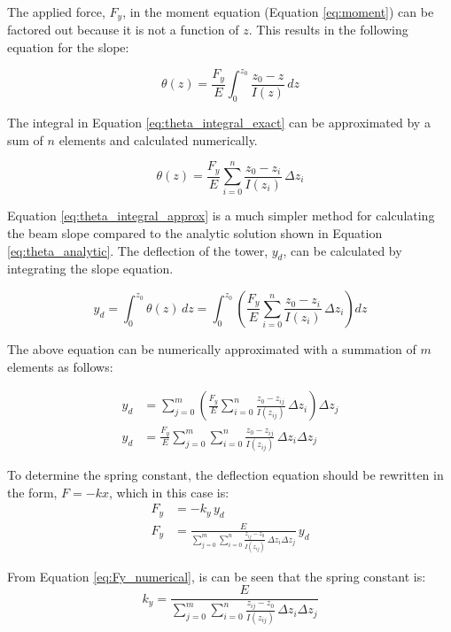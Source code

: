 The applied force, $F_y$, in the moment equation (Equation \ref{eq:moment}) can be factored out because it is not a function of $z$.  This results in the following equation for the slope:

\begin{equation} \label{eq:theta_integral_exact}
	\theta(z) = \frac{F_y}{E} \int_0^{z_0}{\frac{z_0-z}{I(z)}\,dz}
\end{equation}

The integral in Equation \ref{eq:theta_integral_exact} can be approximated by a sum of $n$ elements and calculated numerically.

\begin{equation} \label{eq:theta_integral_approx}
	\theta(z) = \frac{F_y}{E} \sum_{i=0}^{n}{\frac{z_0-z_i}{I(z_i)}\,\Delta z_i}
\end{equation}

Equation \ref{eq:theta_integral_approx} is a much simpler method for calculating the beam slope compared to the analytic solution shown in Equation \ref{eq:theta_analytic}.  The deflection of the tower, $y_d$, can be calculated by integrating the slope equation.

\begin{equation}
	y_d = \int_{0}^{z_0}{\theta(z)\,dz} = \int_{0}^{z_0}{\left(\frac{F_y}{E} \sum_{i=0}^{n}{\frac{z_0-z_i}{I(z_i)}\,\Delta z_i}\right)dz}
\end{equation}

The above equation can be numerically approximated with a summation of $m$ elements as follows:

\begin{align}
	y_d &= \sum_{j=0}^{m}{\left(\frac{F_y}{E} \sum_{i=0}^{n}{\frac{z_0-z_{ij}}{I(z_{ij})}\,\Delta z_i}\right) \Delta z_j} \\
	y_d &= \frac{F_y}{E}\sum_{j=0}^{m}{\sum_{i=0}^{n}{\frac{z_0-z_{ij}}{I(z_{ij})}\,\Delta z_i} \Delta z_j}
\end{align}

To determine the spring constant, the deflection equation should be rewritten in the form, $F=-kx$, which in this case is:
\begin{align}
	F_y &= -k_y \, y_d \\
	F_y &= \frac{E}{\sum_{j=0}^{m}{\sum_{i=0}^{n}{\frac{z_{ij}-z_0}{I(z_{ij})}\,\Delta z_i} \Delta z_j}} \, y_d \label{eq:Fy_numerical}
\end{align}

From Equation \ref{eq:Fy_numerical}, is can be seen that the spring constant is:
\begin{equation} \label{eq:ky}
	k_y = \frac{E}{\sum_{j=0}^{m}{\sum_{i=0}^{n}{\frac{z_{ij}-z_0}{I(z_{ij})}\,\Delta z_i} \Delta z_j}}
\end{equation}


